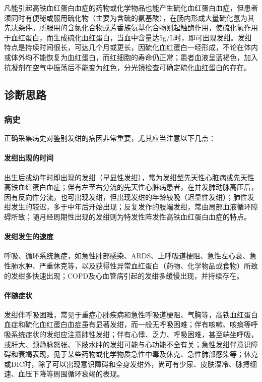凡能引起高铁血红蛋白血症的药物或化学物品也能产生硫化血红蛋白血症，但患者须同时有便秘或服用硫化物（主要为含硫的氨基酸），在肠内形成大量硫化氢为其先决条件。所服用的含氮化合物或芳香族氨基化合物则起触酶作用，使硫化氢作用于血红蛋白，而生成硫化血红蛋白，当血中含量达5g/L时，即可出现发绀。发绀特点是持续时间很长，可达几个月或更长，因硫化血红蛋白一经形成，不论在体内或体外均不能恢复为血红蛋白，而红细胞的寿命仍正常；患者血液呈蓝褐色，加入抗凝剂在空气中振荡后不能变为红色，分光镜检查可确定硫化血红蛋白的存在。

\subsection{诊断思路}

\subsubsection{病史}

正确采集病史对鉴别发绀的病因非常重要，尤其应当注意以下几点：

\paragraph{发绀出现的时间}

出生后或幼年时即出现的发绀（早显性发绀），常为发绀型先天性心脏病或先天性高铁血红蛋白血症；伴有左至右分流的先天性心脏病患者，在并发肺动脉高压后，因有反向性分流，也可出现发绀，但出现发绀的年龄较晚（迟显性发绀）；肺性发绀发生的较迟，多于中年后开始出现；反复发作的肢端发绀，常由局部血液循环障碍所致；随月经周期性出现的发绀则为特发性阵发性高铁血红蛋白血症的特点。

\paragraph{发绀发生的速度}

呼吸、循环系统急症，如急性肺部感染、ARDS、上呼吸道梗阻、急性左心衰、急性肺水肿、严重休克等，以及获得性异常血红蛋白（药物、化学物品或食物）所致的发绀多快速出现；COPD及心血管病引起的发绀多缓慢出现，并持续存在。

\paragraph{伴随症状}

发绀伴呼吸困难，常见于重症心肺疾病和急性呼吸道梗阻、气胸等，高铁血红蛋白血症和硫化血红蛋白血症虽有显著发绀，而一般无呼吸困难；伴有咳嗽、咳痰等呼吸系统症状的发绀应注意肺性发绀；伴有心悸、乏力、呼吸困难，甚至端坐呼吸，或肝大、颈静脉怒张、下肢水肿的发绀可能与心功能不全有关；急性发绀伴意识障碍和衰竭表现，见于某些药物或化学物质急性中毒及休克、急性肺部感染等；休克或DIC时，除了可以出现意识障碍和全身发绀外，尚可有少尿、皮肤湿冷、脉搏细速、血压下降等周围循环衰竭的表现。

